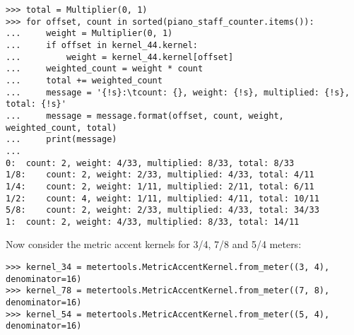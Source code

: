 \begin{comment}
<abjad>
total = Multiplier(0, 1)
for offset, count in sorted(piano_staff_counter.items()):
    weight = Multiplier(0, 1)
    if offset in kernel_44.kernel:
        weight = kernel_44.kernel[offset]
    weighted_count = weight * count
    total += weighted_count
    message = '{!s}:\tcount: {}, weight: {!s}, multiplied: {!s}, total: {!s}'
    message = message.format(offset, count, weight, weighted_count, total)
    print(message)

</abjad>
\end{comment}

\begin{abjadbookoutput}
\begin{singlespacing}
\vspace{-0.5\baselineskip}
\begin{verbatim}
>>> total = Multiplier(0, 1)
>>> for offset, count in sorted(piano_staff_counter.items()):
...     weight = Multiplier(0, 1)
...     if offset in kernel_44.kernel:
...         weight = kernel_44.kernel[offset]
...     weighted_count = weight * count
...     total += weighted_count
...     message = '{!s}:\tcount: {}, weight: {!s}, multiplied: {!s}, total: {!s}'
...     message = message.format(offset, count, weight, weighted_count, total)
...     print(message)
...
0:	count: 2, weight: 4/33, multiplied: 8/33, total: 8/33
1/8:	count: 2, weight: 2/33, multiplied: 4/33, total: 4/11
1/4:	count: 2, weight: 1/11, multiplied: 2/11, total: 6/11
1/2:	count: 4, weight: 1/11, multiplied: 4/11, total: 10/11
5/8:	count: 2, weight: 2/33, multiplied: 4/33, total: 34/33
1:	count: 2, weight: 4/33, multiplied: 8/33, total: 14/11
\end{verbatim}
\end{singlespacing}
\end{abjadbookoutput}

\noindent Now consider the metric accent kernels for 3/4, 7/8 and 5/4 meters:

\begin{comment}
<abjad>
kernel_34 = metertools.MetricAccentKernel.from_meter((3, 4), denominator=16)
kernel_78 = metertools.MetricAccentKernel.from_meter((7, 8), denominator=16)
kernel_54 = metertools.MetricAccentKernel.from_meter((5, 4), denominator=16)
</abjad>
\end{comment}

\begin{abjadbookoutput}
\begin{singlespacing}
\vspace{-0.5\baselineskip}
\begin{verbatim}
>>> kernel_34 = metertools.MetricAccentKernel.from_meter((3, 4), denominator=16)
>>> kernel_78 = metertools.MetricAccentKernel.from_meter((7, 8), denominator=16)
>>> kernel_54 = metertools.MetricAccentKernel.from_meter((5, 4), denominator=16)
\end{verbatim}
\end{singlespacing}
\end{abjadbookoutput}

